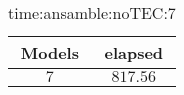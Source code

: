 \begin{table}[!ht]
	\centering
	\begin{tabular}{|c|c|}
		\hline
		Models & elapsed \\ \hline
		$7$ & $817.56$ \\ \hline
	\end{tabular}
	\caption{time:ansamble:noTEC:7}
	\label{tab:time:ansamble:noTEC:7}
\end{table}
